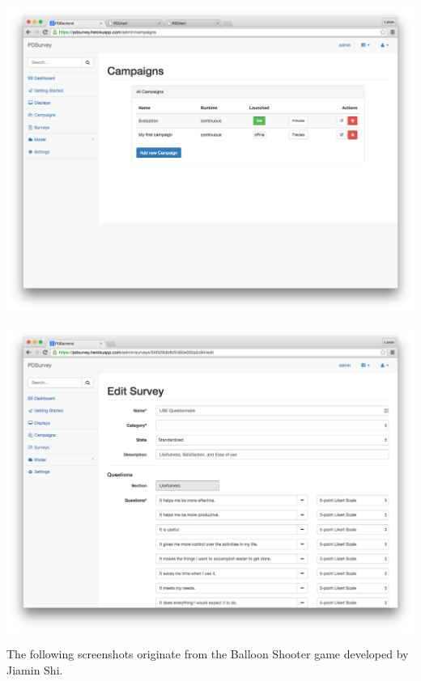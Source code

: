  \label{screenshot:pdadmin-campaigns}
    \begin{center}
        \includegraphics[width=\columnwidth]{img/screenshots/pdadmin/campaigns.png}
    \end{center}


 \label{screenshot:pdadmin-surveys}
    \begin{center}
        \includegraphics[width=\columnwidth]{img/screenshots/pdadmin/surveys.png}
    \end{center}






\label{appendix:screenshots-balloon-shooter}

The following screenshots originate from the Balloon Shooter game developed by Jiamin Shi.


